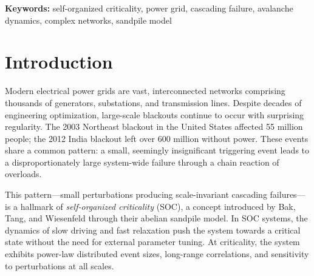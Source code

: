 \documentclass[12pt,a4paper]{article}
\begin{document}
\begin{abstract}
Power grids are among the most critical infrastructure systems in modern society, and their failure dynamics exhibit hallmarks of complex systems.
In this work, we model a power transmission network as a graph of interconnected substations and analyse how small, random perturbations can trigger cascading blackouts that propagate through the network.
Using a sandpile-inspired drive-dissipation model on scale-free, small-world, and random network topologies, we simulate 20,000 time steps of stochastic load injection and cascade relaxation.
The resulting avalanche-size distribution follows a power law with exponent $\alpha \approx 2.31$ on the scale-free topology, consistent with self-organized criticality (SOC).
We further examine the relationship between network connectivity and cascade severity, finding that large avalanches coincide with sharp drops in the size of the largest connected component.
Comparative analysis across topologies reveals that scale-free networks are most susceptible to heavy-tailed cascade distributions, while random networks exhibit thinner tails.
These findings support the hypothesis that real power grids, which share structural features with scale-free networks, naturally evolve towards a self-organized critical state.
\end{abstract}

\textbf{Keywords:} self-organized criticality, power grid, cascading failure, avalanche dynamics, complex networks, sandpile model


\section{Introduction}
\label{sec:intro}

Modern electrical power grids are vast, interconnected networks comprising thousands of generators, substations, and transmission lines.
Despite decades of engineering optimization, large-scale blackouts continue to occur with surprising regularity.
The 2003 Northeast blackout in the United States affected 55 million people; the 2012 India blackout left over 600 million without power.
These events share a common pattern: a small, seemingly insignificant triggering event leads to a disproportionately large system-wide failure through a chain reaction of overloads.

This pattern---small perturbations producing scale-invariant cascading failures---is a hallmark of \textit{self-organized criticality} (SOC), a concept introduced by Bak, Tang, and Wiesenfeld \cite{bak1987} through their abelian sandpile model.
In SOC systems, the dynamics of slow driving and fast relaxation push the system towards a critical state without the need for external parameter tuning.
At criticality, the system exhibits power-law distributed event sizes, long-range correlations, and sensitivity to perturbations at all scales.
\end{document}
